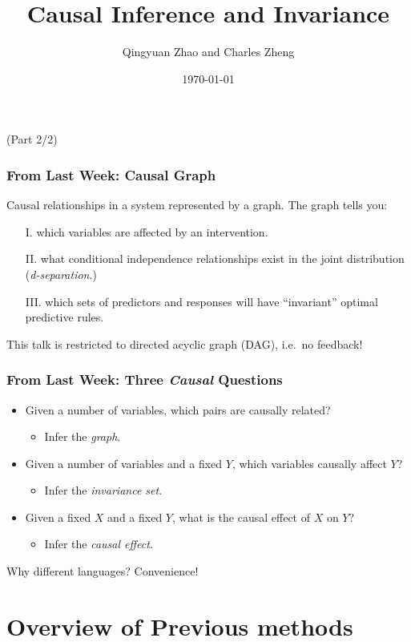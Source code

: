 \documentclass{beamer}
\title[Informal]{Causal Inference and Invariance}
\author[Zhao and Zheng]{Qingyuan Zhao and Charles Zheng}
\institute[Stanford]
{Stanford University}
\date{\today}
\begin{document}
\begin{frame}
  \titlepage
  (Part 2/2)
\end{frame}

\begin{frame}
  \frametitle{From Last Week: Causal Graph}
  Causal relationships in a system represented by a graph.  The graph tells you:
  \begin{itemize}
  \item[I.] which variables are affected by an intervention.
  \item[II.] what conditional independence relationships exist in the joint distribution (\emph{d-separation}.)
  \item[III.] which sets of predictors and responses will have ``invariant'' optimal predictive rules.
  \end{itemize}

  This talk is restricted to directed acyclic graph (DAG), i.e.\ no feedback!
\end{frame}

\begin{frame}
  \frametitle{From Last Week: Three \emph{Causal} Questions}
  \begin{itemize}
  \item Given a number of variables, which pairs are causally related?
    \begin{itemize}
    \item Infer the \emph{graph}.
    \end{itemize}
  \item Given a number of variables and a fixed $Y$, which variables
    causally affect $Y$?
    \begin{itemize}
    \item Infer the \emph{invariance set}.
    \end{itemize}
  \item Given a fixed $X$ and a fixed $Y$, what is the causal effect of
    $X$ on $Y$?
    \begin{itemize}
    \item Infer the \emph{causal effect}.
    \end{itemize}
  \end{itemize}

  \begin{center}
    Why different languages? Convenience!
  \end{center}

\end{frame}

\section{Overview of Previous methods}
\label{sec:previous-methods}
\end{document}
